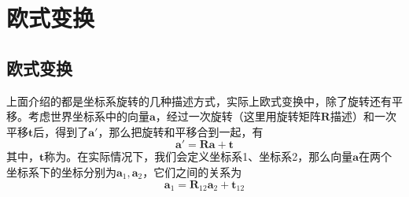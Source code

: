 \section{欧式变换}
\subsection{欧式变换}
上面介绍的都是坐标系旋转的几种描述方式，实际上欧式变换中，除了旋转还有平移。考虑世界坐标系中的向量$\bm{a}$，经过一次旋转（这里用旋转矩阵$\bm{R}$描述）和一次平移$\bm{t}$后，得到了$\bm{a}'$，那么把旋转和平移合到一起，有
\begin{equation}
    \bm{a}' = \bm{R}\bm{a} + \bm{t}
\end{equation}
其中，$\bm{t}$称为。在实际情况下，我们会定义坐标系1、坐标系2，那么向量$\bm{a}$在两个坐标系下的坐标分别为$\bm{a}_1, \bm{a}_2$，它们之间的关系为
\begin{equation}
    \bm{a}_1 = \bm{R}_{12} \bm{a}_2 + \bm{t}_{12}
    \label{欧式变换1}
\end{equation}


